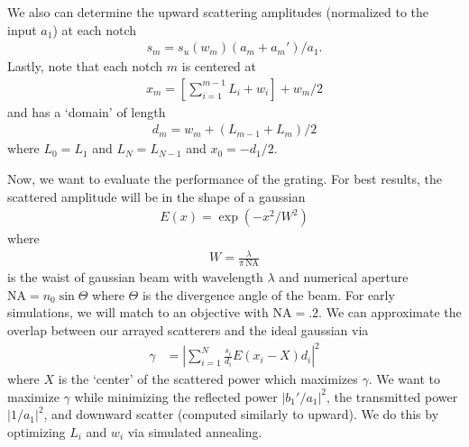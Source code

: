 \documentclass[10pt, letter, oneside,graphicx]{article}
\begin{document}
We also can determine the upward scattering amplitudes (normalized to the input $a_1$) at each notch
\begin{align*}
s_m = s_u(w_m)(a_m + a_m')/a_1.
\end{align*}
Lastly, note that each notch $m$ is centered at
\begin{align*}
x_m = \left[\sum_{i = 1}^{m-1} L_i + w_i\right] + w_m/2
\end{align*}
and has a `domain' of length
\begin{align*}
d_m = w_m + (L_{m-1} + L_m)/2
\end{align*}
where $L_0 = L_1$ and $L_N = L_{N-1}$ and $x_0 = -d_1/2$.

Now, we want to evaluate the performance of the grating. For best results, the scattered amplitude will be in the shape of a gaussian
\begin{align*}
E(x) = \exp(-x^2/W^2)
\end{align*}
where
\begin{align*}
W = \frac{\lambda}{\pi \, \text{NA}}
\end{align*}
is the waist of gaussian beam with wavelength $\lambda$ and numerical aperture $\text{NA} = n_0\sin\Theta$ where $\Theta$ is the divergence angle of the beam. For early simulations, we will match to an objective with $\text{NA} = .2$.
We can approximate the overlap between our arrayed scatterers and the ideal gaussian via
\begin{align*}
\gamma 
&= \left| \sum_{i=1}^N \frac{s_i}{d_i}E(x_i-X)d_i \right|^2
\end{align*}
where $X$ is the `center' of the scattered power which maximizes $\gamma$.
We want to maximize $\gamma$ while minimizing the reflected power $|b_1'/a_1|^2$, the transmitted power $|1/a_1|^2$, and downward scatter (computed similarly to upward). We do this by optimizing $L_i$ and $w_i$ via simulated annealing.

\end{document}

